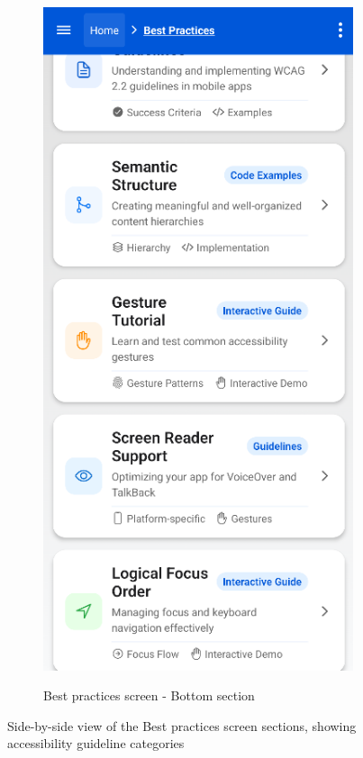 \begin{figure}[ht]
\begin{subfigure}[b]{0.48\textwidth}
        \centering
        \includegraphics[width=\linewidth, alt={Second part of the Best practices screen}]{img/practices2.png}
        \caption{Best practices screen - Bottom section}
        \label{fig:best-practices-bottom}
    \end{subfigure}
    \caption{Side-by-side view of the Best practices screen sections, showing accessibility guideline categories}
    \label{fig:best_practices_screens_sidebyside}
\end{figure}

